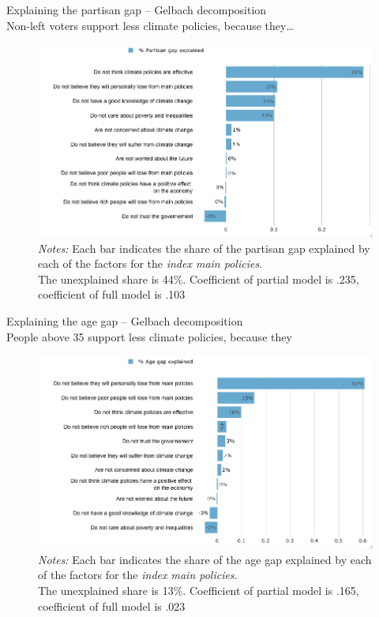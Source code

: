 \begin{framefont}{\small}
\begin{frame}{Explaining the partisan gap -- Gelbach decomposition\\ Non-left voters support less climate policies, because they…}%
\begin{figure}[h!]
\includegraphics[width=.65\textwidth]{../figures/FR/gelbach_vote_agg_no_fairness_index_main_policies} \\
{\tiny \textit{Notes:} Each bar indicates the share of the partisan gap explained by each of the factors for the \textit{index main policies}.\\ The unexplained share is 44\%. Coefficient of partial model is .235, coefficient of full model is .103}
\end{figure}
\end{frame}

\begin{frame}{Explaining the age gap -- Gelbach decomposition \\ People above 35 support less climate policies, because they}%
\begin{figure}[h!]
\includegraphics[width=.65\textwidth]{../figures/FR/gelbach_young_no_fairness_index_main_policies} \\
{\tiny \textit{Notes:} Each bar indicates the share of the age gap explained by each of the factors for the \textit{index main policies}.\\ The unexplained share is 13\%. Coefficient of partial model is .165, coefficient of full model is .023}
\end{figure}
\end{frame}



\end{framefont}
